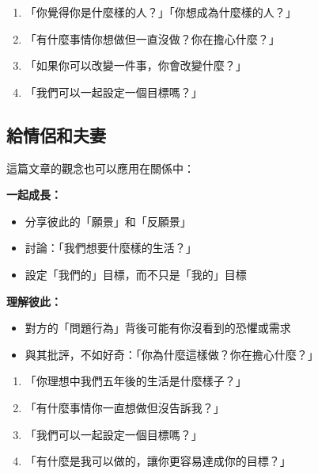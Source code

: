 \documentclass[12pt,a4paper]{article}
\begin{document}
\begin{tcolorbox}[colback=emergency_blue!5!white, colframe=emergency_blue, title=\textbf{親子對話題目}]
\begin{enumerate}
    \item 「你覺得你是什麼樣的人？」「你想成為什麼樣的人？」
    \item 「有什麼事情你想做但一直沒做？你在擔心什麼？」
    \item 「如果你可以改變一件事，你會改變什麼？」
    \item 「我們可以一起設定一個目標嗎？」
\end{enumerate}
\end{tcolorbox}

\subsection{給情侶和夫妻}

這篇文章的觀念也可以應用在關係中：

\textbf{一起成長：}
\begin{itemize}
    \item 分享彼此的「願景」和「反願景」
    \item 討論：「我們想要什麼樣的生活？」
    \item 設定「我們的」目標，而不只是「我的」目標
\end{itemize}

\textbf{理解彼此：}
\begin{itemize}
    \item 對方的「問題行為」背後可能有你沒看到的恐懼或需求
    \item 與其批評，不如好奇：「你為什麼這樣做？你在擔心什麼？」
\end{itemize}

\begin{tcolorbox}[colback=yellow!10!white,colframe=orange!75!black,title=\textbf{情侶/夫妻對話題目}]
\begin{enumerate}
    \item 「你理想中我們五年後的生活是什麼樣子？」
    \item 「有什麼事情你一直想做但沒告訴我？」
    \item 「我們可以一起設定一個目標嗎？」
    \item 「有什麼是我可以做的，讓你更容易達成你的目標？」
\end{enumerate}
\end{tcolorbox}
\end{document}

